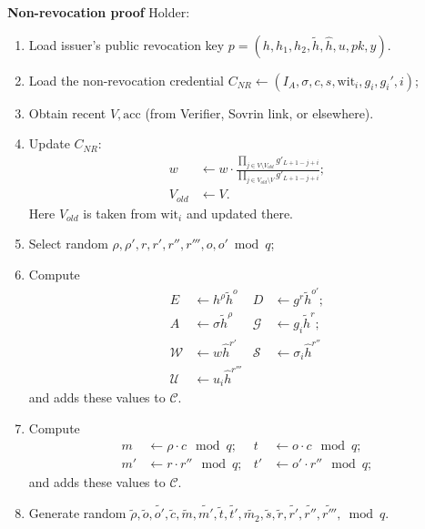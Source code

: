 \label{sec:prepare}

\textbf{Non-revocation proof}
Holder:
\begin{enumerate}
\item Load issuer's public revocation key $p = (h,h_1,h_2,\widetilde{h},\widehat{h},u,pk,y)$.
\item Load the non-revocation credential $C_{NR}\leftarrow(I_A,\sigma,c,s,\mathrm{wit}_i,g_i,g_i',i)$;
\item Obtain recent $V,\mathrm{acc}$ (from Verifier, Sovrin link, or elsewhere).
\item Update $C_{NR}$:
\begin{align*}
w&\leftarrow w\cdot \frac{\prod_{j\in V\setminus V_{old}}g'_{L+1-j+i}}{\prod_{j\in V_{old}\setminus V}g'_{L+1-j+i}};\\
V_{old}&\leftarrow V.
\end{align*}
Here $ V_{old}$ is taken from $\mathrm{wit}_i$ and updated there.

\item Select random $\rho,\rho',r,r',r'',r''',o,o'\bmod{q}$;
\item Compute
\begin{align}
E &\leftarrow h^{\rho} \widetilde{h}^o &
D & \leftarrow g^r\widetilde{h}^{o'};\\
A &\leftarrow \sigma \widetilde{h}^{\rho}&
\mathcal{G} &\leftarrow g_i\widetilde{h}^r;\\
\mathcal{W} &\leftarrow w\widehat{h}^{r'} &
\mathcal{S}&\leftarrow \sigma_i \widehat{h}^{r''}\\
\mathcal{U}&\leftarrow u_i \widehat{h}^{r'''}
\end{align}
and adds these values to $\mathcal{C}$.
\item Compute 
\begin{align}
m&\leftarrow \rho \cdot c \mod{q}; & t&\leftarrow o\cdot c \mod{q};\\
m'&\leftarrow r\cdot r''\mod{q}; & t'&\leftarrow o'\cdot r'' \mod{q};
\end{align}
and adds these values to $\mathcal{C}$.
\item Generate random $\widetilde{\rho},\widetilde{o},\widetilde{o'},\widetilde{c},
\widetilde{m},\widetilde{m'},\widetilde{t},\widetilde{t'},
\widetilde{m_2},\widetilde{s},
\widetilde{r},\widetilde{r'},\widetilde{r''},\widetilde{r'''},
\bmod{q}$.


\end{enumerate}
